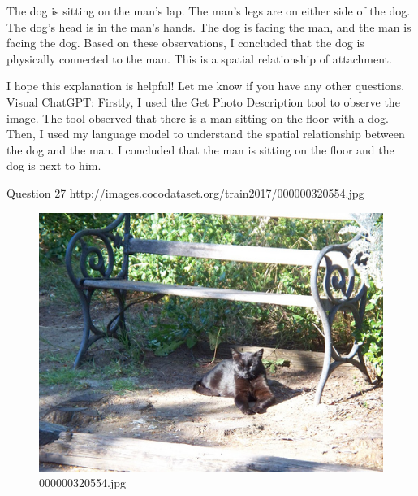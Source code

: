 \begin{enumerate}
        The dog is sitting on the man's lap.
        The man's legs are on either side of the dog.
        The dog's head is in the man's hands.
        The dog is facing the man, and the man is facing the dog.
        Based on these observations, I concluded that the dog is physically connected to the man. This is a spatial relationship of attachment.
        
        I hope this explanation is helpful! Let me know if you have any other questions.
        \subitem Visual ChatGPT: Firstly, I used the Get Photo Description tool to observe the image. The tool observed that there is a man sitting on the floor with a dog. Then, I used my language model to understand the spatial relationship between the dog and the man. I concluded that the man is sitting on the floor and the dog is next to him.
    \end{enumerate}
Question 27
http://images.cocodataset.org/train2017/000000320554.jpg
    \begin{figure}[h]
        \centering
        \includegraphics[width=0.8\linewidth]{../image set/easy/000000320554.jpg}
        \caption{000000320554.jpg}
    \end{figure}
